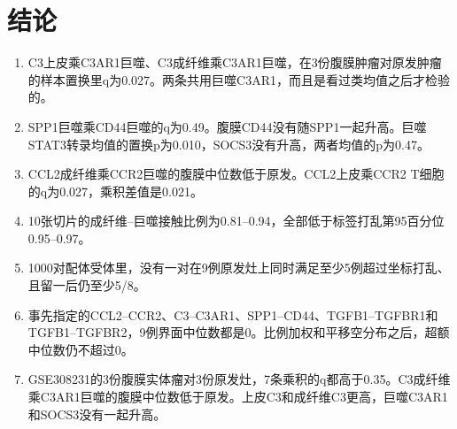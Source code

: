 \section{结论}
\label{sec:conclusion}

\begin{enumerate}
  \item C3上皮乘C3AR1巨噬、C3成纤维乘C3AR1巨噬，在3份腹膜肿瘤对原发肿瘤的样本置换里q为0.027。两条共用巨噬C3AR1，而且是看过类均值之后才检验的。
  \item SPP1巨噬乘CD44巨噬的q为0.49。腹膜CD44没有随SPP1一起升高。巨噬STAT3转录均值的置换p为0.010，SOCS3没有升高，两者均值的p为0.47。
  \item CCL2成纤维乘CCR2巨噬的腹膜中位数低于原发。CCL2上皮乘CCR2 T细胞的q为0.027，乘积差值是0.021。
  \item 10张切片的成纤维--巨噬接触比例为0.81--0.94，全部低于标签打乱第95百分位0.95--0.97。
  \item 1000对配体受体里，没有一对在9例原发灶上同时满足至少5例超过坐标打乱、且留一后仍至少5/8。
  \item 事先指定的CCL2--CCR2、C3--C3AR1、SPP1--CD44、TGFB1--TGFBR1和TGFB1--TGFBR2，9例界面中位数都是0。比例加权和平移空分布之后，超额中位数仍不超过0。
  \item GSE308231的3份腹膜实体瘤对3份原发灶，7条乘积的q都高于0.35。C3成纤维乘C3AR1巨噬的腹膜中位数低于原发。上皮C3和成纤维C3更高，巨噬C3AR1和SOCS3没有一起升高。
\end{enumerate}
